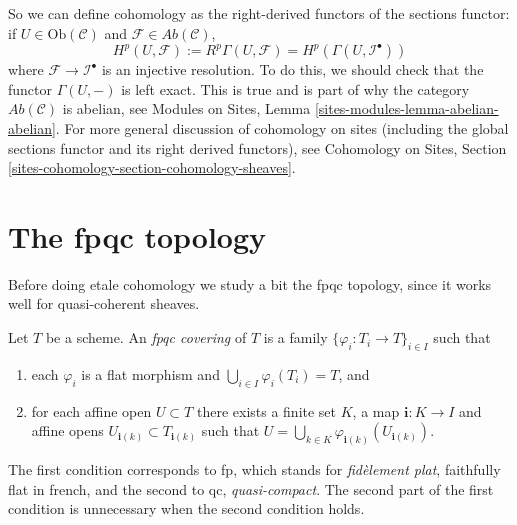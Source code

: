 \noindent
So we can define cohomology as the right-derived functors of the
sections functor: if $U \in \text{Ob}(\mathcal{C})$ and
$\mathcal{F} \in \textit{Ab}(\mathcal{C})$,
$$
H^p(U, \mathcal{F}) :=
R^p\Gamma(U, \mathcal{F}) =
H^p(\Gamma(U, \mathcal{I}^\bullet))
$$
where $\mathcal{F} \to \mathcal{I}^\bullet$ is an injective resolution. To do
this, we should check that the functor $\Gamma(U, -)$ is left exact. This is
true and is part of why the category $\textit{Ab}(\mathcal{C})$ is abelian,
see
Modules on Sites, Lemma \ref{sites-modules-lemma-abelian-abelian}.
For more general discussion of cohomology on sites (including the
global sections functor and its right derived functors), see
Cohomology on Sites, Section \ref{sites-cohomology-section-cohomology-sheaves}.



\section{The fpqc topology}
\label{section-fpqc}

\noindent
Before doing etale cohomology we study a bit the fpqc topology, since
it works well for quasi-coherent sheaves.

\begin{definition}
\label{definition-fpqc-covering}
Let $T$ be a scheme. An {\it fpqc covering} of $T$ is a family
$\{ \varphi_i : T_i \to T\}_{i \in I}$ such that
\begin{enumerate}
\item each $\varphi_i$ is a flat morphism and
$\bigcup_{i\in I} \varphi_i(T_i) = T$, and
\item for each affine open $U \subset T$ there exists a finite
set $K$, a map $\mathbf{i} : K \to I$ and affine opens
$U_{\mathbf{i}(k)} \subset T_{\mathbf{i}(k)}$ such that
$U = \bigcup_{k \in K} \varphi_{\mathbf{i}(k)}(U_{\mathbf{i}(k)})$.
\end{enumerate}
\end{definition}

\begin{remark}
\label{remark-fpqc}
The first condition corresponds to fp, which stands for
{\it fid\`element plat}, faithfully flat in french, and
the second to qc, {\it quasi-compact}. The second part of
the first condition is unnecessary when the second condition holds.
\end{remark}

